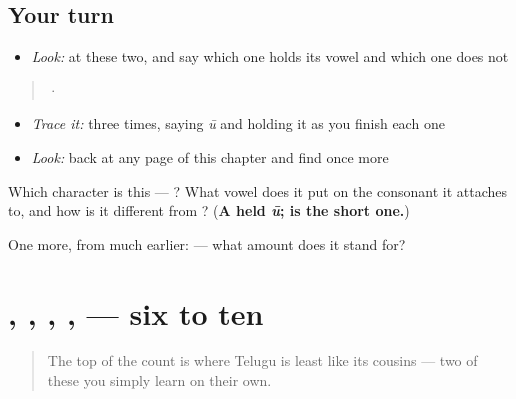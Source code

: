 \subsection*{Your turn}
\begin{itemize}
\raggedright
  \item \emph{Look:} at these two, and say which one holds its vowel and which one does not
\end{itemize}

\begin{quote}
  ·  
\end{quote}

\begin{itemize}
\raggedright
  \item \emph{Trace it:}  three times, saying \emph{ū} and holding it as you finish each one
  \item \emph{Look:} back at any page of this chapter and find  once more
\end{itemize}

\begin{tcolorbox}[breakable,colback=teal!4,colframe=teal!35!black,title={Before you move on}]
Which character is this — ? What vowel does it put on the consonant it attaches to, and how is it different from ? (\textbf{A held \emph{ū};  is the short one.})

One more, from much earlier:  — what amount does it stand for?
\end{tcolorbox}
\section[\texorpdfstring{\te{ఆరు} \te{ఏడు} \te{ఎనిమిది} … (āru ēḍu enimidi …)}{ఆరు ఏడు ఎనిమిది … (āru ēḍu enimidi …)}]{, , , ,  — six to ten}

\label{lesson:TE-C07-numbers-6-10}



\begin{quote}
The top of the count is where Telugu is least like its cousins — two of these you simply learn on their own.
\end{quote}

